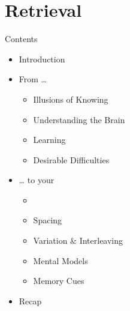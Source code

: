 \documentclass{ercisbeamer}
\begin{document}
\section{Retrieval}
\begin{frame}{Contents}
    \begin{itemize}
        \item Introduction
        \item From …
        \begin{itemize}
            \item Illusions of Knowing
            \item Understanding the Brain
            \item Learning
            \item Desirable Difficulties
        \end{itemize}
        \item … to your 
        \begin{itemize}
            \item {}
            \item Spacing
            \item Variation \& Interleaving
            \item Mental Models
            \item Memory Cues
        \end{itemize}
        \item Recap
    \end{itemize}
\end{frame}
\end{document}
